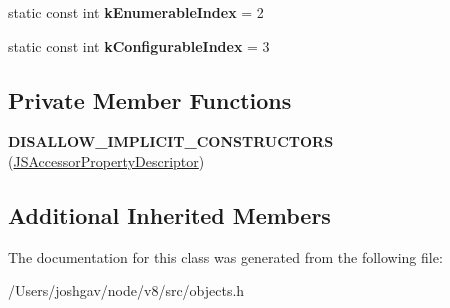 \begin{DoxyCompactItemize}
\item 
static const int {\bfseries k\+Enumerable\+Index} = 2\hypertarget{classv8_1_1internal_1_1_j_s_accessor_property_descriptor_a5fcacb03cc31776efe073fda8bd0eccb}{}\label{classv8_1_1internal_1_1_j_s_accessor_property_descriptor_a5fcacb03cc31776efe073fda8bd0eccb}

\item 
static const int {\bfseries k\+Configurable\+Index} = 3\hypertarget{classv8_1_1internal_1_1_j_s_accessor_property_descriptor_a7236acacb18e1db4fc0ea9b8ddf94b39}{}\label{classv8_1_1internal_1_1_j_s_accessor_property_descriptor_a7236acacb18e1db4fc0ea9b8ddf94b39}

\end{DoxyCompactItemize}
\subsection*{Private Member Functions}
\begin{DoxyCompactItemize}
\item 
{\bfseries D\+I\+S\+A\+L\+L\+O\+W\+\_\+\+I\+M\+P\+L\+I\+C\+I\+T\+\_\+\+C\+O\+N\+S\+T\+R\+U\+C\+T\+O\+RS} (\hyperlink{classv8_1_1internal_1_1_j_s_accessor_property_descriptor}{J\+S\+Accessor\+Property\+Descriptor})\hypertarget{classv8_1_1internal_1_1_j_s_accessor_property_descriptor_a59e7467232e44be2c3502c1a8c7a34cd}{}\label{classv8_1_1internal_1_1_j_s_accessor_property_descriptor_a59e7467232e44be2c3502c1a8c7a34cd}

\end{DoxyCompactItemize}
\subsection*{Additional Inherited Members}


The documentation for this class was generated from the following file\+:\begin{DoxyCompactItemize}
\item 
/\+Users/joshgav/node/v8/src/objects.\+h\end{DoxyCompactItemize}
